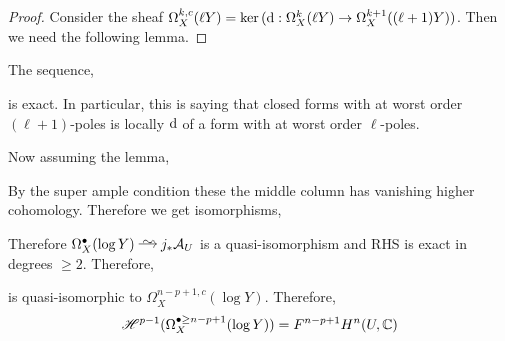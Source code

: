 \documentclass[12pt]{article}
\begin{document}
\begin{proof}
Consider the sheaf $\Omega_X^{k,c}(\ell Y) = \ker{(\mathrm{d}: \Omega_X^k(\ell Y) \to \Omega_X^{k+1}((\ell + 1) Y))}$. Then we need the following lemma.
\end{proof}

\begin{lemma}
The sequence,
\begin{center}
\end{center}
is exact. In particular, this is saying that closed forms with at worst order $(\ell + 1)$-poles is locally $\mathrm{d}$ of a form with at worst order $\ell$-poles.
\end{lemma}

Now assuming the lemma,
\begin{center}
\end{center}
By the super ample condition these the middle column has vanishing higher cohomology. Therefore we get isomorphisms,
\begin{center}
\end{center}
Therefore $\Omega^\bullet_X(\log{Y}) \iso j_* \cA_U$ is a quasi-isomorphism and RHS is exact in degrees $\ge 2$. Therefore,
\begin{center}
\end{center}
is quasi-isomorphic to $\Omega_X^{n-p+1,c}(\log{Y})$. Therefore,
\[ \mathscr{H}^{p-1}(\Omega_X^{\bullet \ge n - p +1}(\log{Y})) = F^{n-p+1} H^n(U, \mathbb{C}) \]
\end{document}
